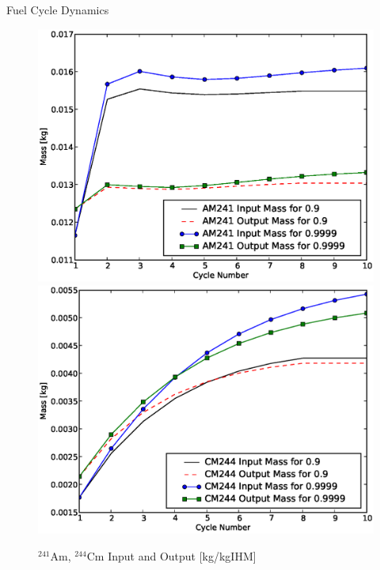 \documentclass[pdf, autumn, slideColor, nocolorBG]{prosper}
\newcommand{\superscript}[1]{\ensuremath{^{\textrm{#1}}}}
\newcommand{\nuc}[2]{\superscript{#2}{#1}}
\begin{document}
\begin{slide}{Fuel Cycle Dynamics}
\vspace{0.75cm}
\begin{center}
\begin{figure}
\caption{\nuc{Am}{241}, \nuc{Cm}{244} Input and Output [kg/kgIHM]}
\includegraphics[scale=0.275]{../se_sensitivity/figs/AM241InOutSepEff.eps} 
\includegraphics[scale=0.275]{../se_sensitivity/figs/CM244InOutSepEff.eps}
\end{figure}
\end{center}
\end{slide}
\end{document}
